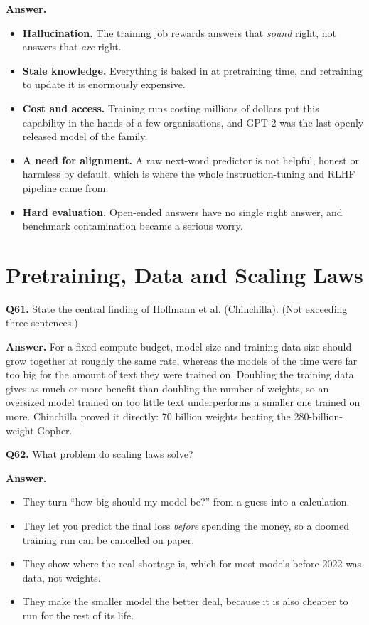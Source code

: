 \documentclass[11pt]{article}
\begin{document}
\textbf{Answer.}
\begin{itemize}
  \item \textbf{Hallucination.} The training job rewards answers that \emph{sound} right, not answers that \emph{are} right.
  \item \textbf{Stale knowledge.} Everything is baked in at pretraining time, and retraining to update it is enormously expensive.
  \item \textbf{Cost and access.} Training runs costing millions of dollars put this capability in the hands of a few organisations, and GPT-2 was the last openly released model of the family.
  \item \textbf{A need for alignment.} A raw next-word predictor is not helpful, honest or harmless by default, which is where the whole instruction-tuning and RLHF pipeline came from.
  \item \textbf{Hard evaluation.} Open-ended answers have no single right answer, and benchmark contamination became a serious worry.
\end{itemize}

\section{Pretraining, Data and Scaling Laws}

\textbf{Q61.} State the central finding of Hoffmann et al. (Chinchilla). (Not exceeding three
sentences.)

\textbf{Answer.} For a fixed compute budget, model size and training-data size should grow
together at roughly the same rate, whereas the models of the time were far too big for the
amount of text they were trained on. Doubling the training data gives as much or more benefit
than doubling the number of weights, so an oversized model trained on too little text
underperforms a smaller one trained on more. Chinchilla proved it directly: 70 billion weights
beating the 280-billion-weight Gopher.

\medskip
\textbf{Q62.} What problem do scaling laws solve?

\textbf{Answer.}
\begin{itemize}
  \item They turn ``how big should my model be?'' from a guess into a calculation.
  \item They let you predict the final loss \emph{before} spending the money, so a doomed training run can be cancelled on paper.
  \item They show where the real shortage is, which for most models before 2022 was data, not weights.
  \item They make the smaller model the better deal, because it is also cheaper to run for the rest of its life.
\end{itemize}
\end{document}

